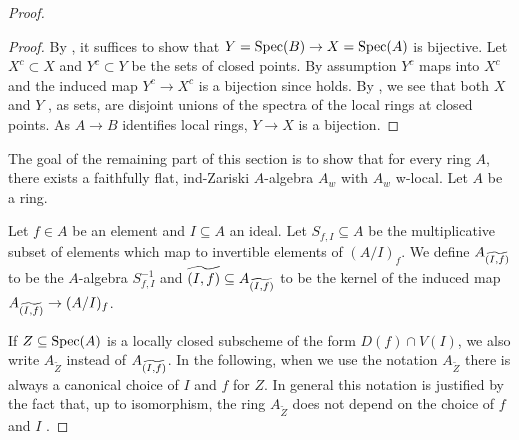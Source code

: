 \begin{proof}
\begin{proof}
  By , it suffices to show
  that $Y = \operatorname{Spec} (B) \to X = \operatorname{Spec} (A)$ is bijective.
  Let $X^c \subset X$ and $Y^c \subset Y$ be the sets of closed points. By assumption $Y^c$ maps into $X^c$ and the induced map $Y^c \to X^c$ is a bijection since  holds. By , we see that both $X$ and $Y$ , as sets, are disjoint unions of the spectra of the local rings at closed points. As \(A \to B\) identifies local rings, $Y \to X$ is a bijection.
\end{proof}

The goal of the remaining part of this section is to show that for every ring $A$, there exists a faithfully flat, ind-Zariski
$A$-algebra $A_{w}$ with $A_w$ w-local. Let $A$ be a ring.

\begin{definition}
    Let $f \in A$ be an element and $I \subseteq A$ an ideal.
    Let $S_{f, I} \subseteq A$ be the multiplicative subset of elements which map to invertible
    elements of $(A/I)_{f}$.
    We define $A_{\widetilde{(I, f)}}$ to be the $A$-algebra $S_{f, I}^{-1}$
    and $\widetilde{(I, f)} \subseteq A_{\widetilde{(I, f)}}$ to be the kernel of
    the induced map $A_{\widetilde{(I, f)}} \to (A / I)_{f}$.
    \label{def:tilde-locclosed}
\end{definition}

If $Z \subseteq \mathrm{Spec}(A)$ is a locally closed subscheme of the form $D(f) \cap V(I)$, we
also write $A_{\widetilde{Z}}$ instead of $A_{\widetilde{(I, f)}}$.
In the following, when we use the notation $A_{\widetilde{Z}}$ there is always a canonical
choice of $I$ and $f$ for $Z$.
In general this notation is justified by the fact that, up to isomorphism, the ring $A_{\widetilde{Z}}$ does not depend
on the choice of $f$ and $I$ .


\end{proof}
